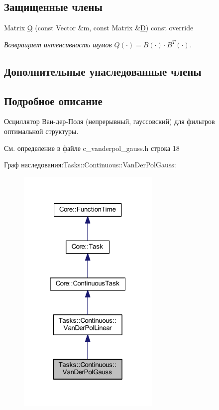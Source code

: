 \subsection*{Защищенные члены}
\begin{DoxyCompactItemize}
\item 
\hypertarget{class_tasks_1_1_continuous_1_1_van_der_pol_gauss_aefe0f9432c2c283fba65ca73e6092f28}{}\label{class_tasks_1_1_continuous_1_1_van_der_pol_gauss_aefe0f9432c2c283fba65ca73e6092f28} 
Matrix \hyperlink{class_tasks_1_1_continuous_1_1_van_der_pol_gauss_aefe0f9432c2c283fba65ca73e6092f28}{Q} (const Vector \&m, const Matrix \&\hyperlink{class_tasks_1_1_continuous_1_1_van_der_pol_linear_a07e8842a175006f214238a9f71e5ebdf}{D}) const override
\begin{DoxyCompactList}\small\item\em Возвращает интенсивность шумов $Q(\cdot) = B(\cdot) \cdot B^T(\cdot)$. \end{DoxyCompactList}\end{DoxyCompactItemize}
\subsection*{Дополнительные унаследованные члены}


\subsection{Подробное описание}
Осциллятор Ван-\/дер-\/Поля (непрерывный, гауссовский) для фильтров оптимальной структуры. 

См. определение в файле c\+\_\+vanderpol\+\_\+gauss.\+h строка 18



Граф наследования\+:Tasks\+:\+:Continuous\+:\+:Van\+Der\+Pol\+Gauss\+:
\nopagebreak
\begin{figure}[H]
\begin{center}
\leavevmode
\includegraphics[width=193pt]{class_tasks_1_1_continuous_1_1_van_der_pol_gauss__inherit__graph}
\end{center}
\end{figure}


